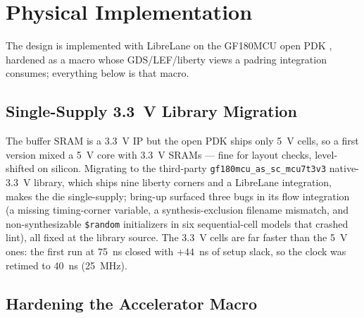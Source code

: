 \documentclass[conference,a4paper]{APSIPA2026}
\begin{document}
\section{Physical Implementation}\label{sec:phys}

The design is implemented with LibreLane \cite{librelane} on the GF180MCU open PDK \cite{gf180pdk}, hardened as a macro whose GDS/LEF/liberty views a padring integration consumes; everything below is that macro.

\subsection{Single-Supply 3.3~V Library Migration}
The buffer SRAM \cite{gf180sram} is a 3.3~V IP but the open PDK ships only 5~V cells, so a first version mixed a 5~V core with 3.3~V SRAMs --- fine for layout checks, level-shifted on silicon. Migrating to the third-party \texttt{gf180mcu\_as\_sc\_mcu7t3v3} native-3.3~V library, which ships nine liberty corners and a LibreLane integration, makes the die single-supply; bring-up surfaced three bugs in its flow integration (a missing timing-corner variable, a synthesis-exclusion filename mismatch, and non-synthesizable \texttt{\$random} initializers in six sequential-cell models that crashed lint), all fixed at the library source. The 3.3~V cells are far faster than the 5~V ones: the first run at 75~ns closed with $+44$~ns of setup slack, so the clock was retimed to 40~ns (25~MHz).

\subsection{Hardening the Accelerator Macro}
\end{document}
